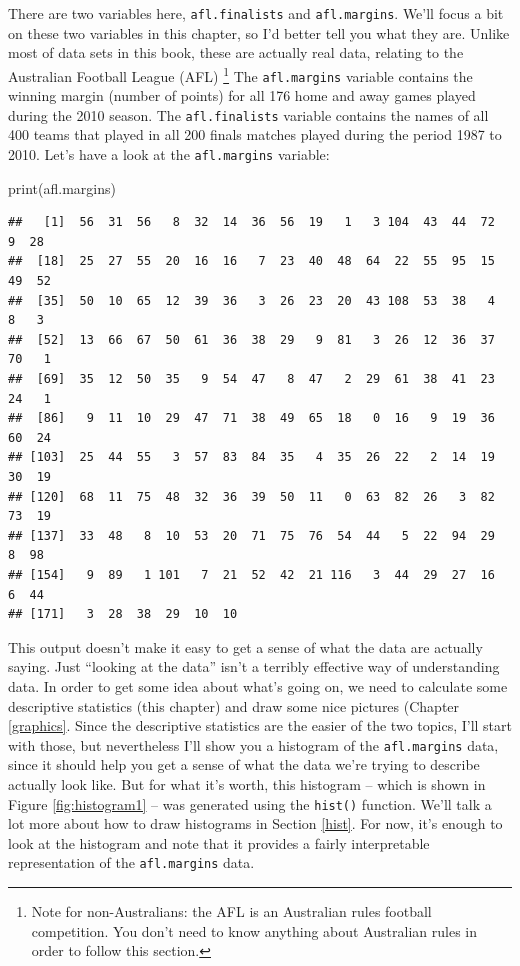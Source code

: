 \documentclass[
]{book}
\newenvironment{Shaded}{\begin{snugshade}}{\end{snugshade}}
\newcommand{\FunctionTok}[1]{\textcolor[rgb]{0.00,0.00,0.00}{#1}}
\newcommand{\NormalTok}[1]{#1}
\begin{document}
There are two variables here, \texttt{afl.finalists} and \texttt{afl.margins}. We'll focus a bit on these two variables in this chapter, so I'd better tell you what they are. Unlike most of data sets in this book, these are actually real data, relating to the Australian Football League (AFL) \footnote{Note for non-Australians: the AFL is an Australian rules football competition. You don't need to know anything about Australian rules in order to follow this section.} The \texttt{afl.margins} variable contains the winning margin (number of points) for all 176 home and away games played during the 2010 season. The \texttt{afl.finalists} variable contains the names of all 400 teams that played in all 200 finals matches played during the period 1987 to 2010. Let's have a look at the \texttt{afl.margins} variable:

\begin{Shaded}
\begin{Highlighting}[]
\FunctionTok{print}\NormalTok{(afl.margins)}
\end{Highlighting}
\end{Shaded}

\begin{verbatim}
##   [1]  56  31  56   8  32  14  36  56  19   1   3 104  43  44  72   9  28
##  [18]  25  27  55  20  16  16   7  23  40  48  64  22  55  95  15  49  52
##  [35]  50  10  65  12  39  36   3  26  23  20  43 108  53  38   4   8   3
##  [52]  13  66  67  50  61  36  38  29   9  81   3  26  12  36  37  70   1
##  [69]  35  12  50  35   9  54  47   8  47   2  29  61  38  41  23  24   1
##  [86]   9  11  10  29  47  71  38  49  65  18   0  16   9  19  36  60  24
## [103]  25  44  55   3  57  83  84  35   4  35  26  22   2  14  19  30  19
## [120]  68  11  75  48  32  36  39  50  11   0  63  82  26   3  82  73  19
## [137]  33  48   8  10  53  20  71  75  76  54  44   5  22  94  29   8  98
## [154]   9  89   1 101   7  21  52  42  21 116   3  44  29  27  16   6  44
## [171]   3  28  38  29  10  10
\end{verbatim}

This output doesn't make it easy to get a sense of what the data are actually saying. Just ``looking at the data'' isn't a terribly effective way of understanding data. In order to get some idea about what's going on, we need to calculate some descriptive statistics (this chapter) and draw some nice pictures (Chapter \ref{graphics}. Since the descriptive statistics are the easier of the two topics, I'll start with those, but nevertheless I'll show you a histogram of the \texttt{afl.margins} data, since it should help you get a sense of what the data we're trying to describe actually look like. But for what it's worth, this histogram -- which is shown in Figure \ref{fig:histogram1} -- was generated using the \texttt{hist()} function. We'll talk a lot more about how to draw histograms in Section \ref{hist}. For now, it's enough to look at the histogram and note that it provides a fairly interpretable representation of the \texttt{afl.margins} data.
\end{document}
